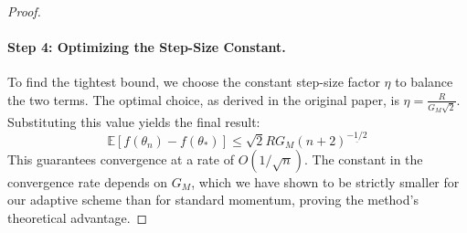 \documentclass{article}
\newcommand{\E}{\mathbb{E}}
\begin{document}
\begin{proof}
\paragraph{Step 4: Optimizing the Step-Size Constant.}
To find the tightest bound, we choose the constant step-size factor \(\eta\) to balance the two terms. The optimal choice, as derived in the original paper, is \(\eta = \frac{R}{G_M\sqrt{2}}\). Substituting this value yields the final result:
\[ \E[f(\theta_n) - f(\theta_*)] \le \sqrt{2}RG_M (n+2)^{\underline{-1/2}} \]
This guarantees convergence at a rate of \(O(1/\sqrt{n})\). The constant in the convergence rate depends on \(G_M\), which we have shown to be strictly smaller for our adaptive scheme than for standard momentum, proving the method's theoretical advantage.
\end{proof}
\end{document}
